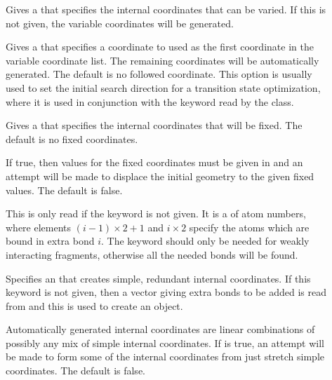 \begin{description}
  \item[] Gives a 
     that specifies the internal coordinates
    that can be varied. If this is not given, the variable coordinates will
    be generated.

  \item[] Gives a 
     that specifies a coordinate to used as the
    first coordinate in the variable coordinate list.  The remaining
    coordinates will be automatically generated.  The default is no
    followed coordinate.  This option is usually used to set the initial
    search direction for a transition state optimization, where it is used
    in conjunction with the  keyword read by the
     class.

  \item[] Gives a 
     that specifies the internal coordinates
    that will be fixed.  The default is no fixed coordinates.

  \item[] If true, then values for the fixed
    coordinates must be given in  and an attempt will be made
    to displace the initial geometry to the given fixed values. The default
    is false.

  \item[] This is only read if the 
     keyword is not given.  It is a  of atom
     numbers, where elements $(i-1)\times 2 + 1$ and $i\times 2$ specify
     the atoms which are bound in extra bond $i$.  The 
     keyword should only be needed for weakly interacting fragments,
     otherwise all the needed bonds will be found.

  \item[] Specifies an 
     that creates simple, redundant internal
    coordinates. If this keyword is not given, then a vector giving extra
    bonds to be added is read from  and this is used to
    create an  object.

  \item[] Automatically generated internal
    coordinates are linear combinations of possibly any mix of simple
    internal coordinates.  If  is true, an attempt
    will be made to form some of the internal coordinates from just stretch
    simple coordinates.  The default is false.


\end{description}
